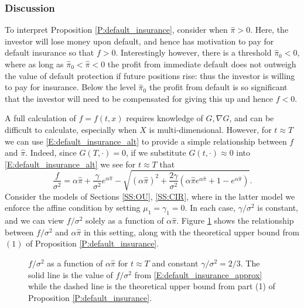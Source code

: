 \documentclass[11pt, letterpaper]{amsart}
\theoremstyle{definition}
\theoremstyle{remark}
\numberwithin{equation}{section}
\newcommand{\hpi}{\hat{\pi}}
\begin{document}
\subsubsection{Discussion}\label{SSS:default_insurance_discussion}

To interpret Proposition \ref{P:default_insurance}, consider when $\hpi > 0$. Here, the investor will lose money upon default, and hence has motivation to pay for default insurance so that $f>0$. Interestingly however, there is a threshold $\hpi_0<0$, where as long as $\hpi_0 < \hpi < 0$ the profit from immediate default does not outweigh the value of default protection if future positions rise: thus the investor is willing to pay for insurance.  Below the level $\hpi_0$ the profit from default is so significant that the investor will need to be compensated for giving this up and hence $f<0$.

A full calculation of $f = f(t,x)$ requires knowledge of $G,\nabla G$, and can be difficult to calculate, especially when $X$ is multi-dimensional.  However, for $t\approx T$ we can use \eqref{E:default_insurance_alt} to provide a simple relationship between $f$ and $\hpi$. Indeed, since $G(T,\cdot) = 0$, if we substitute $G(t,\cdot)\approx 0$ into \eqref{E:default_insurance_alt} we see for $t\approx T$ that
\begin{equation}\label{E:default_insurance_approx}
\frac{f}{\sigma^2}  = \alpha\hpi + \frac{\gamma}{\sigma^2}e^{\alpha\hpi} - \sqrt{(\alpha\hpi)^2 + \frac{2\gamma}{\sigma^2}\left(\alpha\hpi e^{\alpha \hpi} + 1 - e^{\alpha\hpi}\right)}.
\end{equation}
Consider the models of Sections \ref{SS:OU}, \ref{SS:CIR}, where in the latter model we enforce the affine condition by setting $\mu_1=\gamma_1=0$. In each case, $\gamma/\sigma^2$ is constant, and we can view $f/\sigma^2$ solely as a function of $\alpha\hpi$. Figure \ref{F:Ins_Fig} shows the relationship between $f/\sigma^2$ and $\alpha\hpi$ in this setting, along with the theoretical upper bound from $(1)$ of Proposition \ref{P:default_insurance}.


\begin{figure}
\caption{$f/\sigma^2$ as a function of $\alpha\hpi$ for $t\approx T$ and constant $\gamma/\sigma^2= 2/3$.  The solid line is the value of $f/\sigma^2$ from \eqref{E:default_insurance_approx} while the dashed line is the theoretical upper bound from part (1) of Proposition \ref{P:default_insurance}.} \label{F:Ins_Fig}
\end{figure}
\end{document}
